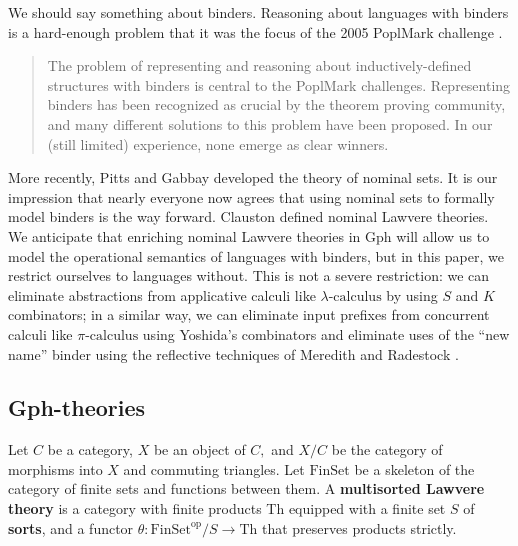 \documentclass[a4paper,UKenglish]{article}
\newcommand{\maps}{\colon}
\newcommand{\Th}{\mathrm{Th}}
\newcommand{\FinSet}{\mathrm{FinSet}}
\newcommand{\op}{\mathrm{op}}
\newcommand{\pic}{$\pi\mbox{-calculus}$\xspace}
\newcommand{\lac}{$\lambda\mbox{-calculus}$\xspace}
\begin{document}
We should say something about binders.  Reasoning about languages with binders is a hard-enough problem that it was the focus of the 2005 PoplMark challenge \cite{PoplMark}.
\begin{quote}
  The problem of representing and reasoning about inductively-defined structures with binders is central to the PoplMark challenges. Representing binders has been recognized as crucial by the theorem proving community, and many different solutions to this problem have been proposed. In our (still limited) experience, none emerge as clear winners.
\end{quote}
More recently, Pitts and Gabbay \cite{PittsGabbay} developed the theory of nominal sets.  It is our impression that nearly everyone now agrees that using nominal sets to formally model binders is the way forward.  Clauston \cite{Clauston}
defined nominal Lawvere theories.  We anticipate that enriching nominal Lawvere theories in Gph will allow us to model the operational semantics of languages with binders, but in this paper, we restrict ourselves to languages without.  This is not a severe restriction: we can eliminate abstractions from applicative calculi like \lac by using $S$ and $K$ combinators; in a similar way, we can eliminate input prefixes from concurrent calculi like \pic using Yoshida's combinators \cite{Yoshida} and eliminate uses of the ``new name'' binder using the reflective techniques of Meredith and Radestock \cite{MeredithRadestock}.


\subsection{Gph-theories}

Let $C$ be a category, $X$ be an object of $C,$ and $X/C$ be the category of morphisms into $X$ and commuting triangles.  Let $\FinSet$ be a skeleton of the category of finite sets and functions between them.  A {\bf multisorted Lawvere theory} is a category with finite products Th equipped with a finite set $S$ of {\bf sorts}, and a functor $\theta\maps \FinSet^{\op}/S \to \Th$ that preserves products strictly.
\end{document}
